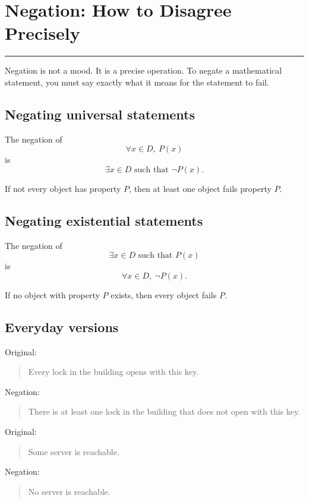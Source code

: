 \documentclass[12pt]{article}
\newcommand{\chapterline}{\vspace{0.4em}\hrule\vspace{0.8em}}
\begin{document}
\newpage
\section{Negation: How to Disagree Precisely}
\chapterline

Negation is not a mood. It is a precise operation. To negate a mathematical statement, you must say exactly what it means for the statement to fail.

\subsection{Negating universal statements}

The negation of
\[
\forall x\in D,\ P(x)
\]
is
\[
\exists x\in D\text{ such that }\neg P(x).
\]

If not every object has property $P$, then at least one object fails property $P$.

\subsection{Negating existential statements}

The negation of
\[
\exists x\in D\text{ such that }P(x)
\]
is
\[
\forall x\in D,\ \neg P(x).
\]

If no object with property $P$ exists, then every object fails $P$.

\subsection{Everyday versions}

Original:

\begin{quote}
Every lock in the building opens with this key.
\end{quote}

Negation:

\begin{quote}
There is at least one lock in the building that does not open with this key.
\end{quote}

Original:

\begin{quote}
Some server is reachable.
\end{quote}

Negation:

\begin{quote}
No server is reachable.
\end{quote}
\end{document}
